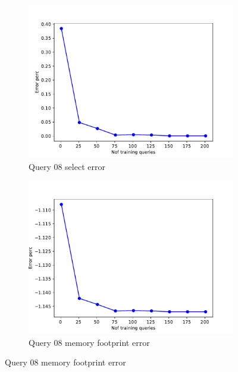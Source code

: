 \begin{figure}[!htb]
     \begin{subfigure}[t]{0.5\textwidth}
       \includegraphics[scale=0.4]{figs/tpch10/tpch10_sel08_error.pdf}
       \caption{Query 08 select error}
       \label{fig:tpch_sel08}
      \end{subfigure}
      \begin{subfigure}[t]{0.5\textwidth}
        \includegraphics[scale=0.4]{figs/tpch10/tpch10_q08_memerror.pdf}
        \caption{Query 08 memory footprint error}
        \label{fig:tpch_mem08}
      \end{subfigure}
\end{figure}

